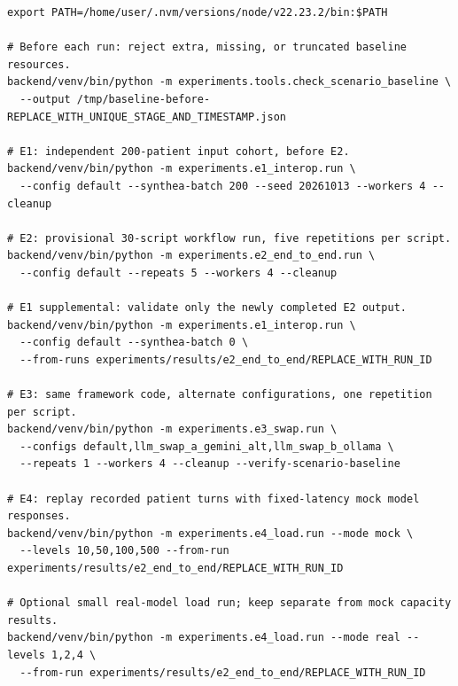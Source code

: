 \begin{Verbatim}[breaklines=true,fontsize=\small]
export PATH=/home/user/.nvm/versions/node/v22.23.2/bin:$PATH

# Before each run: reject extra, missing, or truncated baseline resources.
backend/venv/bin/python -m experiments.tools.check_scenario_baseline \
  --output /tmp/baseline-before-REPLACE_WITH_UNIQUE_STAGE_AND_TIMESTAMP.json

# E1: independent 200-patient input cohort, before E2.
backend/venv/bin/python -m experiments.e1_interop.run \
  --config default --synthea-batch 200 --seed 20261013 --workers 4 --cleanup

# E2: provisional 30-script workflow run, five repetitions per script.
backend/venv/bin/python -m experiments.e2_end_to_end.run \
  --config default --repeats 5 --workers 4 --cleanup

# E1 supplemental: validate only the newly completed E2 output.
backend/venv/bin/python -m experiments.e1_interop.run \
  --config default --synthea-batch 0 \
  --from-runs experiments/results/e2_end_to_end/REPLACE_WITH_RUN_ID

# E3: same framework code, alternate configurations, one repetition per script.
backend/venv/bin/python -m experiments.e3_swap.run \
  --configs default,llm_swap_a_gemini_alt,llm_swap_b_ollama \
  --repeats 1 --workers 4 --cleanup --verify-scenario-baseline

# E4: replay recorded patient turns with fixed-latency mock model responses.
backend/venv/bin/python -m experiments.e4_load.run --mode mock \
  --levels 10,50,100,500 --from-run experiments/results/e2_end_to_end/REPLACE_WITH_RUN_ID

# Optional small real-model load run; keep separate from mock capacity results.
backend/venv/bin/python -m experiments.e4_load.run --mode real --levels 1,2,4 \
  --from-run experiments/results/e2_end_to_end/REPLACE_WITH_RUN_ID
\end{Verbatim}
